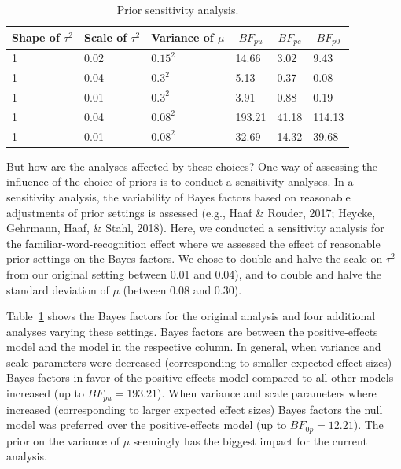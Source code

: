 \documentclass[english,,man]{apa6}
\begin{document}
\begin{table}[tbp]

\begin{center}
\begin{threeparttable}

\caption{\label{tab:tabsens}Prior sensitivity analysis.}

\begin{tabular}{llllll}
\toprule
Shape of $\tau^2$ & \multicolumn{1}{c}{Scale of $\tau^2$} & \multicolumn{1}{c}{Variance of $\mu$} & \multicolumn{1}{c}{$BF_{pu}$} & \multicolumn{1}{c}{$BF_{pc}$} & \multicolumn{1}{c}{$BF_{p0}$}\\
\midrule
1 & 0.02 & $0.15^2$ & 14.66 & 3.02 & 9.43\\
1 & 0.04 & $0.3^2$ & 5.13 & 0.37 & 0.08\\
1 & 0.01 & $0.3^2$ & 3.91 & 0.88 & 0.19\\
1 & 0.04 & $0.08^2$ & 193.21 & 41.18 & 114.13\\
1 & 0.01 & $0.08^2$ & 32.69 & 14.32 & 39.68\\
\bottomrule
\end{tabular}

\end{threeparttable}
\end{center}

\end{table}

But how are the analyses affected by these choices? One way of assessing the influence of the choice of priors is to conduct a sensitivity analyses. In a sensitivity analysis, the variability of Bayes factors based on reasonable adjustments of prior settings is assessed (e.g., Haaf \& Rouder, 2017; Heycke, Gehrmann, Haaf, \& Stahl, 2018). Here, we conducted a sensitivity analysis for the familiar-word-recognition effect where we assessed the effect of reasonable prior settings on the Bayes factors. We chose to double and halve the scale on \(\tau^2\) from our original setting between 0.01 and 0.04), and to double and halve the standard deviation of \(\mu\) (between 0.08 and 0.30).

Table~\ref{tab:tabsens} shows the Bayes factors for the original analysis and four additional analyses varying these settings. Bayes factors are between the positive-effects model and the model in the respective column. In general, when variance and scale parameters were decreased (corresponding to smaller expected effect sizes) Bayes factors in favor of the positive-effects model compared to all other models increased (up to \(BF_{pu} = 193.21\)). When variance and scale parameters where increased (corresponding to larger expected effect sizes) Bayes factors the null model was preferred over the positive-effects model (up to \(BF_{0p} = 12.21\)). The prior on the variance of \(\mu\) seemingly has the biggest impact for the current analysis.
\end{document}
